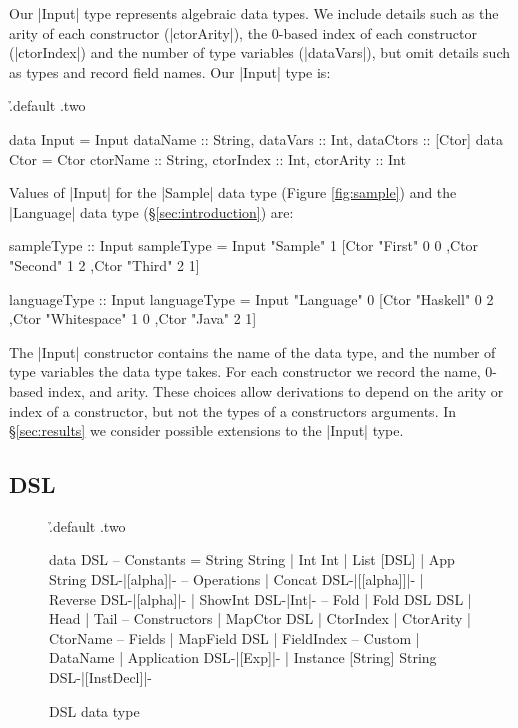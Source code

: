 \documentclass{llncs}
\begin{document}
Our |Input| type represents algebraic data types. We include details such as the arity of each constructor (|ctorArity|), the 0-based index of each constructor (|ctorIndex|) and the number of type variables (|dataVars|), but omit details such as types and record field names. Our |Input| type is:

\h{.default .two}\begin{code}
data Input = Input
    {dataName :: String, dataVars :: Int, dataCtors :: [Ctor]}
data Ctor = Ctor
    {ctorName :: String, ctorIndex :: Int, ctorArity :: Int}
\end{code}

\noindent Values of |Input| for the |Sample| data type (Figure \ref{fig:sample}) and the |Language| data type (\S\ref{sec:introduction}) are:

\begin{code}
sampleType :: Input
sampleType = Input "Sample" 1
    [Ctor "First"   0 0
    ,Ctor "Second"  1 2
    ,Ctor "Third"   2 1]

languageType :: Input
languageType = Input "Language" 0
    [Ctor "Haskell"     0 2
    ,Ctor "Whitespace"  1 0
    ,Ctor "Java"        2 1]
\end{code}

The |Input| constructor contains the name of the data type, and the number of type variables the data type takes. For each constructor we record the name, 0-based index, and arity. These choices allow derivations to depend on the arity or index of a constructor, but not the types of a constructors arguments. In \S\ref{sec:results} we consider possible extensions to the |Input| type.

\subsection{DSL}

\begin{figure}
\h{.default .two}\begin{code}
data DSL
       -- Constants
    =  String String
    |  Int Int
    |  List [DSL]
    |  App String DSL{-|[alpha]|-}
       -- Operations
    |  Concat DSL{-|[[alpha]]|-}
    |  Reverse DSL{-|[alpha]|-}
    |  ShowInt DSL{-|Int|-}
       -- Fold
    |  Fold DSL DSL
    |  Head
    |  Tail
       -- Constructors
    |  MapCtor DSL
    |  CtorIndex
    |  CtorArity
    |  CtorName
       -- Fields
    |  MapField DSL
    |  FieldIndex
       -- Custom
    |  DataName
    |  Application DSL{-|[Exp]|-}
    |  Instance [String] String DSL{-|[InstDecl]|-}
\end{code}
\caption{DSL data type}
\label{fig:dsl}
\end{figure}
\end{document}
